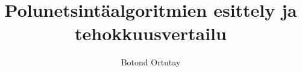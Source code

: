 \documentclass[language=finnish,version=final,mainfont=none,sharelatex=false]{utuftthesis}
\providecommand{\algorithmname}{Algoritmi}
\begin{document}
\title{Polunetsintäalgoritmien esittely ja tehokkuusvertailu}
\author{Botond Ortutay}

\maketitle


\tableofcontents

\listoffigures


\listofacronyms

\renewcommand{\algorithmname}{\listingscaption}


\begin{comment}
To better organize things, create a new tex file for each chapter
and input it below.

Avoid using the å, ä, ö or <space> characters in referred names and
underscores \_ in file names (may break hyperref).

Good luck!
\end{comment}









\printbibliography

\begin{comment}
Important! Create the appendix chapters with command \textbackslash appchapter\{some
name\} instead of \textbackslash chapter\{some name\} for the automagic
page counting to work!
\end{comment}
\end{document}
